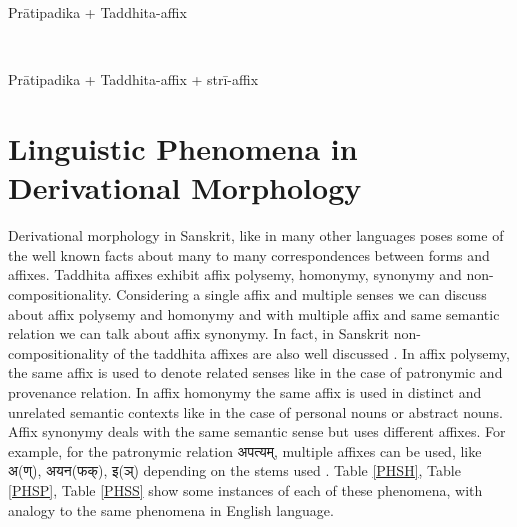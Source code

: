 \documentclass[a4paper,11pt,twoside,openright]{report}
\begin{document}
\\ \\ \centerline{Prātipadika + Taddhita-affix}  \\ \centerline{Prātipadika + Taddhita-affix + strī-affix} 

\section{Linguistic Phenomena in Derivational Morphology}

Derivational morphology in Sanskrit, like in many other languages poses some of the well
known facts about many to many correspondences between forms and affixes. Taddhita affixes exhibit affix polysemy, homonymy, synonymy and non-compositionality. Considering a single affix and multiple senses we can discuss about affix polysemy and homonymy and with multiple affix and same semantic relation we can talk about affix synonymy. In fact, in Sanskrit non-compositionality of the taddhita affixes are also well discussed . In affix polysemy, the same affix is used to denote related senses like in the case of patronymic and provenance relation. In affix homonymy the same affix is used in distinct and unrelated semantic contexts like in the case of personal nouns or abstract nouns. Affix synonymy deals with the same semantic sense but
uses different affixes. For example, for the  patronymic relation {\skt अपत्यम्}, multiple affixes can be used, like {\skt अ(ण्), अयन(फक्), इ(ञ्)} depending on the stems used \cite{deo07}. Table  \ref{PHSH}, Table \ref{PHSP}, Table \ref{PHSS}  show some instances of each of these phenomena, with analogy to the same phenomena in English language.
\\
% 
\end{document}
